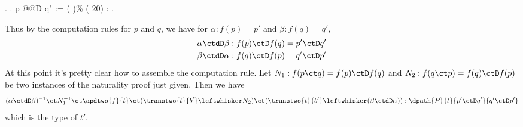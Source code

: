 \begin{coqdoccode}
\coqdocindent{1.00em}
 .\coqdoceol
\coqdocnoindent
{}.\coqdoceol
\coqdocemptyline
\coqdocnoindent
{} p @@D q" := (  )\% (  20) : .\coqdoceol
\coqdocemptyline
\end{coqdoccode}
\noindent
Thus by the computation rules for $p$ and $q$,
we have for $\alpha : f(p) = p'$ and $\beta : f(q) = q'$,
\begin{align*}
  \alpha \ctdD \beta &: f(p) \ctD f(q) = p' \ctD q' \\
  \beta \ctdD \alpha &: f(q) \ctD f(p) = q' \ctD p'
\end{align*}
At this point it's pretty clear how to assemble the computation rule.
Let $N_{1} : f(p \ct q) = f(p) \ctD f(q)$ and $N_{2} : f(q \ct p) = f(q) \ctD
f(p)$ be two instances of the naturality proof just given.  Then we have
\[
  (\alpha \ctdD \beta)^{-1} \ct N^{-1}_{1} 
  \ct \apdtwo{f}{t}
  \ct (\transtwo{t}{b'} \leftwhisker N_{2})
  \ct (\transtwo{t}{b'} \leftwhisker (\beta \ctdD \alpha))
  :
  \dpath{P}{t}{p' \ctD q'}{q' \ctD p'}
\]
which is the type of $t'$.

